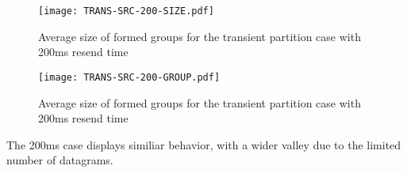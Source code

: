 \begin{figure}[!h]
\centering
\texttt{[image: TRANS-SRC-200-SIZE.pdf]}
\caption{Average size of formed groups for the transient partition case with 200ms resend time}
\label{fig:MGS-TRANS-200}
\end{figure}

\begin{figure}[!h]
\centering
\texttt{[image: TRANS-SRC-200-GROUP.pdf]}
\caption{Average size of formed groups for the transient partition case with 200ms resend time}
\label{fig:IGT-TRANS-200}
\end{figure}

The 200ms case displays similiar behavior, with a wider valley due to the
limited number of datagrams. 
